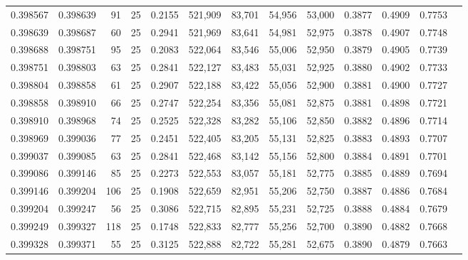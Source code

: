 \begin{tabular}{rrrrrrrrrrrrr}
0.398567 & 0.398639 &    91 &  25 &                                     0.2155 & 521,909 &  83,701 &  54,956 &  53,000 & 0.3877 & 0.4909 & 0.7753 \\
0.398639 & 0.398687 &    60 &  25 &                                     0.2941 & 521,969 &  83,641 &  54,981 &  52,975 & 0.3878 & 0.4907 & 0.7748 \\
0.398688 & 0.398751 &    95 &  25 &                                     0.2083 & 522,064 &  83,546 &  55,006 &  52,950 & 0.3879 & 0.4905 & 0.7739 \\
0.398751 & 0.398803 &    63 &  25 &                                     0.2841 & 522,127 &  83,483 &  55,031 &  52,925 & 0.3880 & 0.4902 & 0.7733 \\
0.398804 & 0.398858 &    61 &  25 &                                     0.2907 & 522,188 &  83,422 &  55,056 &  52,900 & 0.3881 & 0.4900 & 0.7727 \\
0.398858 & 0.398910 &    66 &  25 &                                     0.2747 & 522,254 &  83,356 &  55,081 &  52,875 & 0.3881 & 0.4898 & 0.7721 \\
0.398910 & 0.398968 &    74 &  25 &                                     0.2525 & 522,328 &  83,282 &  55,106 &  52,850 & 0.3882 & 0.4896 & 0.7714 \\
0.398969 & 0.399036 &    77 &  25 &                                     0.2451 & 522,405 &  83,205 &  55,131 &  52,825 & 0.3883 & 0.4893 & 0.7707 \\
0.399037 & 0.399085 &    63 &  25 &                                     0.2841 & 522,468 &  83,142 &  55,156 &  52,800 & 0.3884 & 0.4891 & 0.7701 \\
0.399086 & 0.399146 &    85 &  25 &                                     0.2273 & 522,553 &  83,057 &  55,181 &  52,775 & 0.3885 & 0.4889 & 0.7694 \\
0.399146 & 0.399204 &   106 &  25 &                                     0.1908 & 522,659 &  82,951 &  55,206 &  52,750 & 0.3887 & 0.4886 & 0.7684 \\
0.399204 & 0.399247 &    56 &  25 &                                     0.3086 & 522,715 &  82,895 &  55,231 &  52,725 & 0.3888 & 0.4884 & 0.7679 \\
0.399249 & 0.399327 &   118 &  25 &                                     0.1748 & 522,833 &  82,777 &  55,256 &  52,700 & 0.3890 & 0.4882 & 0.7668 \\
0.399328 & 0.399371 &    55 &  25 &                                     0.3125 & 522,888 &  82,722 &  55,281 &  52,675 & 0.3890 & 0.4879 & 0.7663 \\

\end{tabular}

